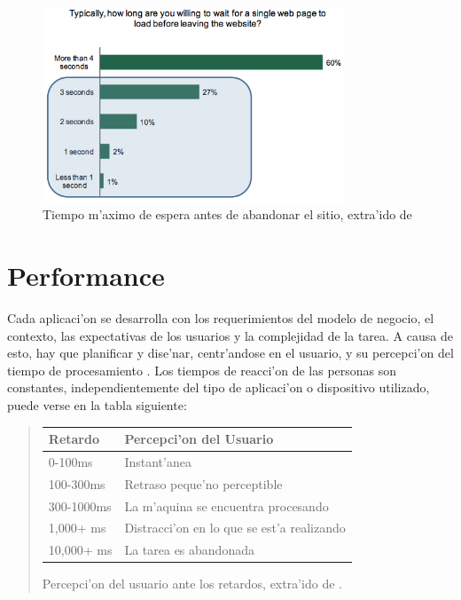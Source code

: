 \begin{figure}[ht!]
	\begin{center}
	\includegraphics[width=340px]{img/aka2}
	\caption{\small Tiempo m'aximo de espera antes de abandonar el sitio, extra'ido de \citep{akamaiPerf}}
	\end{center}
	\label{aka2}
\end{figure}

\section{Performance}

Cada aplicaci'on se desarrolla con los requerimientos del modelo de negocio, el contexto, las expectativas de los usuarios y la complejidad de la tarea. A causa de esto, hay que planificar y dise'nar, centr'andose en el usuario, y su percepci'on del tiempo de procesamiento \citep{highPerformance}.
Los tiempos de reacci'on de las personas son constantes, independientemente del tipo de aplicaci'on o dispositivo utilizado, puede verse en la tabla siguiente:

\begin{quote}
\begin{center}
\begin{tabular}{l | l}
  Retardo & Percepci'on del Usuario \\
  \hline
  0-100ms & Instant'anea \\
  100-300ms & Retraso peque'no perceptible \\
  300-1000ms & La m'aquina se encuentra procesando\\
  1,000+ ms & Distracci'on en lo que se est'a realizando\\
  10,000+ ms & La tarea es abandonada\\
\end{tabular}

Percepci'on del usuario ante los retardos, extra'ido de \citep{highPerformance}.
\end{center}
\end{quote}

